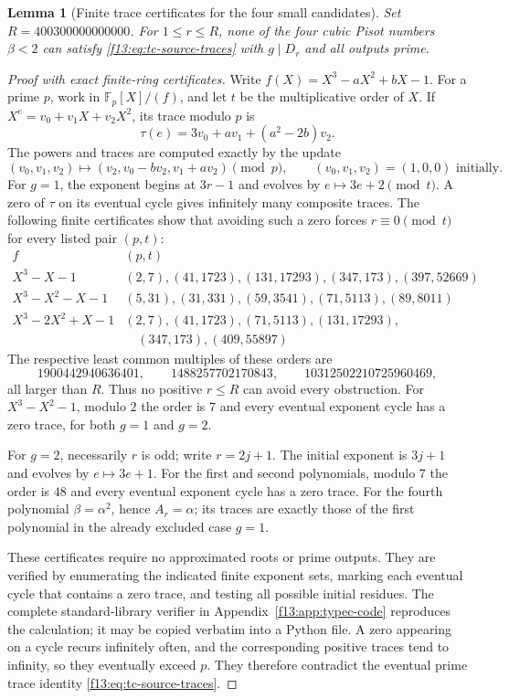 \documentclass[11pt,a4paper]{article}
\newtheorem{lemma}[theorem]{Lemma}
\theoremstyle{definition}
\theoremstyle{remark}
\numberwithin{equation}{section}
\begin{document}
\begin{lemma}[Finite trace certificates for the four small candidates]
\label{f13:lem:type-c-finite-certificate}
Set $R=400300000000000$.  For $1\le r\le R$, none of the four
cubic Pisot numbers $\beta<2$ can satisfy
\eqref{f13:eq:tc-source-traces} with $g\mid D_r$ and all outputs prime.
\end{lemma}
\begin{proof}[Proof with exact finite-ring certificates]
Write $f(X)=X^3-aX^2+bX-1$.  For a prime $p$, work in
$\mathbb F_p[X]/(f)$, and let $t$ be the multiplicative order of
$X$.  If $X^e=v_0+v_1X+v_2X^2$, its trace modulo $p$ is
\[
 \tau(e)=3v_0+av_1+(a^2-2b)v_2.
\]
The powers and traces are computed exactly by the update
\[
 (v_0,v_1,v_2)\longmapsto(v_2,v_0-bv_2,v_1+av_2)\pmod p,
 \qquad (v_0,v_1,v_2)=(1,0,0)\text{ initially}.
\]
For $g=1$, the exponent begins at $3r-1$ and evolves by
$e\mapsto3e+2\pmod t$.  A zero of $\tau$ on its eventual cycle
gives infinitely many composite traces.  The following finite
certificates show that avoiding such a zero forces $r\equiv0\pmod t$
for every listed pair $(p,t)$:
\[
\begin{array}{c|l}
f& (p,t)\\\hline
X^3-X-1&(2,7),(41,1723),(131,17293),(347,173),(397,52669)\\
X^3-X^2-X-1&(5,31),(31,331),(59,3541),(71,5113),(89,8011)\\
X^3-2X^2+X-1&(2,7),(41,1723),(71,5113),(131,17293),\\
&\quad(347,173),(409,55897)
\end{array}
\]
The respective least common multiples of these orders are
\[
 1900442940636401,\qquad1488257702170843,\qquad
 10312502210725960469,
\]
all larger than $R$.  Thus no positive $r\le R$ can avoid every
obstruction.  For $X^3-X^2-1$, modulo $2$ the order is $7$ and
every eventual exponent cycle has a zero trace, for both $g=1$
and $g=2$.

For $g=2$, necessarily $r$ is odd; write $r=2j+1$.
The initial exponent is $3j+1$ and evolves by $e\mapsto3e+1$.
For the first and second polynomials, modulo $7$ the order is
$48$ and every eventual exponent cycle has a zero trace.
For the fourth polynomial $\beta=\alpha^2$, hence $A_r=\alpha$;
its traces are exactly those of the first polynomial in the
already excluded case $g=1$.

These certificates require no approximated roots or prime outputs.
They are verified by enumerating the indicated finite exponent sets,
marking each eventual cycle that contains a zero trace, and testing
all possible initial residues.  The complete standard-library verifier in Appendix~\ref{f13:app:typec-code}
reproduces the calculation; it may be copied verbatim into a Python file.  A zero appearing on a cycle recurs infinitely often,
and the corresponding positive traces tend to infinity, so they
eventually exceed $p$.  They therefore contradict the eventual
prime trace identity \eqref{f13:eq:tc-source-traces}.
\end{proof}
\end{document}
